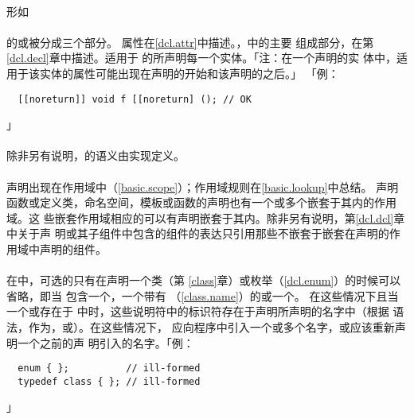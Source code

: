 \paragraph{}
形如                                                                          \\
\mbox{\qquad{} \tm{;}}        \\
的或被分成三个部分。
属性在\ref{dcl.attr}中描述。，中的主要
组成部分，在第\ref{dcl.decl}章中描述。适用于
的所声明每一个实体。「注：在一个声明的实
体中，适用于该实体的属性可能出现在声明的开始和该声明的之后。」
「例：
\begin{lstlisting}
  [[noreturn]] void f [[noreturn] (); // OK
\end{lstlisting}」

\paragraph{}
除非另有说明，的语义由实现定义。

\paragraph{}
声明出现在作用域中（\ref{basic.scope}）；作用域规则在\ref{basic.lookup}中总结。
声明函数或定义类，命名空间，模板或函数的声明也有一个或多个嵌套于其内的作用域。这
些嵌套作用域相应的可以有声明嵌套于其内。除非另有说明，第\ref{dcl.dcl}章中关于声
明或其子组件中包含的组件的表达只引用那些不嵌套于嵌套在声明的作用域中声明的组件。

\paragraph{}
在中，可选的只有在声明一个类（第
\ref{class}章）或枚举（\ref{dcl.enum}）的时候可以省略，即当
包含一个，一个带有
（\ref{class.name}）的或一个。
在这些情况下且当一个或存在于
中时，这些说明符中的标识符存在于声明所声明的名字中（根据
语法，作为，或）。在这些情况下，
应向程序中引入一个或多个名字，或应该重新声明一个之前的声
明引入的名字。「例：
\begin{lstlisting}
  enum { };          // ill-formed
  typedef class { }; // ill-formed
\end{lstlisting}」

